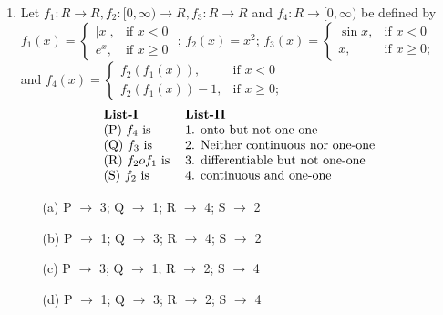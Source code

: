\documentclass[journal,12pt,twocolumn]{IEEEtran}
\begin{document}
\begin{enumerate}
\item Let $f_1:R \to R, f_2:[0,\infty) \to R, f_3:R \to R$ and $f_4:R \to [0,\infty)$ be defined by $f_1(x)=\begin{cases}
|x|, &\text{if $x<0$}\\
e^x, &\text{if $x\geq 0$}
\end{cases}$ ;
$f_2(x)=x^2$; $f_3(x)=\begin{cases}
\sin x, &\text{if $x<0$}\\
x, &\text{if $x\geq 0$};
\end{cases}$ and 
\clearpage
\newpage$f_4(x)=\begin{cases}
f_2(f_1(x)), &\text{if $x<0$}\\
f_2(f_1(x))-1, &\text{if $x\geq 0$};
\end{cases}$
\begin{align*}
\begin{tabular}{ll}
\textbf{List-I} &\textbf{List-II}\\
(P) $f_4$ is & 1. onto but not one-one \\
(Q) $f_3$ is & 2. Neither continuous nor one-one\\
(R) $f_2of_1$ is &3. differentiable but not one-one\\
(S) $f_2$ is &4. continuous and one-one
\end{tabular}
\end{align*}
\begin{itemize}
\item[(a)] P $\to$ 3; Q $\to$ 1; R $\to$ 4; S $\to$ 2
\item[(b)] P $\to$ 1; Q $\to$ 3; R $\to$ 4; S $\to$ 2
\item[(c)] P $\to$ 3; Q $\to$ 1; R $\to$ 2; S $\to$ 4
\item[(d)] P $\to$ 1; Q $\to$ 3; R $\to$ 2; S $\to$ 4
\end{itemize} \item[~]


\end{enumerate}
\end{document}

